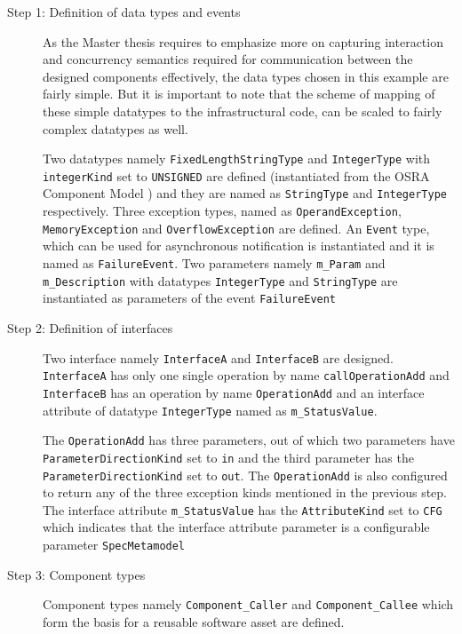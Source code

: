\begin{description}
\item [Step 1: Definition of data types and events] As the Master thesis requires to emphasize more on capturing interaction and concurrency semantics required for communication between the designed components effectively, the data types chosen in this example are fairly simple. But it is important to note that the scheme of mapping of these simple datatypes to the infrastructural code, can be scaled to fairly complex datatypes as well.

Two datatypes namely \texttt{FixedLengthStringType} and \texttt{IntegerType} with \texttt{integerKind} set to \texttt{UNSIGNED} are defined (instantiated from the OSRA Component Model \cite{SpecMetamodel}) and they are named as \texttt{StringType} and \texttt{IntegerType} respectively. Three exception types, named as \texttt{OperandException}, \texttt{MemoryException} and \texttt{OverflowException} are defined. An \texttt{Event} type, which can be used for asynchronous notification \cite{SpecMetamodel} is instantiated and it is named as \texttt{FailureEvent}. Two parameters namely \texttt{m\_Param} and \texttt{m\_Description} with datatypes \texttt{IntegerType} and \texttt{StringType} are instantiated as parameters of the event \texttt{FailureEvent}

\item [Step 2: Definition of interfaces] Two interface namely \texttt{InterfaceA} and \texttt{InterfaceB} are designed. \texttt{InterfaceA} has only one single operation by name \texttt{callOperationAdd} and \texttt{InterfaceB} has an operation by name \texttt{OperationAdd} and an interface attribute of datatype \texttt{IntegerType} named as \texttt{m\_StatusValue}.

The \texttt{OperationAdd} has three parameters, out of which two parameters have \texttt{ParameterDirectionKind} set to \texttt{in} and the third parameter has the \texttt{ParameterDirectionKind} set to \texttt{out}. The \texttt{OperationAdd} is also configured to return any of the three exception kinds mentioned in the previous step. The interface attribute \texttt{m\_StatusValue} has the \texttt{AttributeKind} set to \texttt{CFG} which indicates that the interface attribute parameter is a configurable parameter \texttt{SpecMetamodel}  

\item [Step 3: Component types] Component types namely \texttt{Component\_Caller} and \texttt{Component\_Callee} which form the basis for a reusable software asset are defined. 


\end{description}
